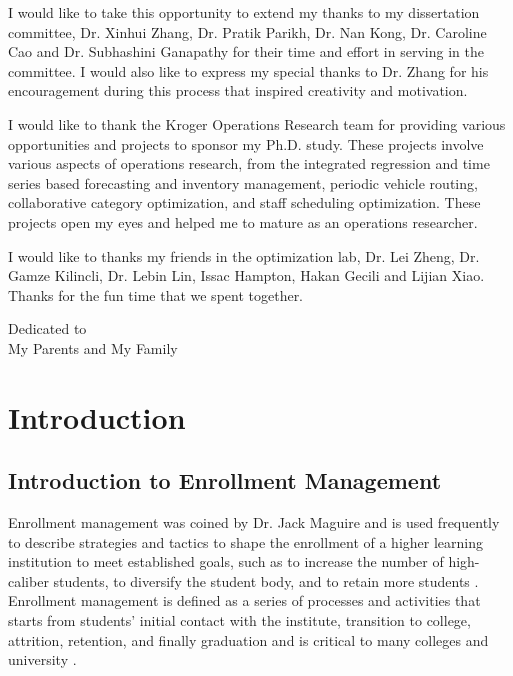 \documentclass[12pt,english]{report}
\begin{document}
\setlength{\parindent}{2em}

I would like to take this opportunity to extend my thanks to my dissertation
committee,  Dr. Xinhui Zhang, Dr. Pratik Parikh, Dr. Nan Kong, Dr. Caroline Cao
and Dr. Subhashini Ganapathy for their time and effort in serving in the
committee.  I would also like to express my special thanks to Dr. Zhang for his
encouragement during this process that inspired creativity and motivation.

I would like to thank the Kroger Operations Research team for providing various
opportunities and projects to sponsor my Ph.D. study.  These projects involve
various aspects of operations research, from the integrated regression and time
series based forecasting and inventory management, periodic vehicle routing,
collaborative category optimization, and staff scheduling optimization.  These
projects open my eyes and helped me to mature as an operations researcher.

I would like to thanks my friends in the optimization lab,  Dr. Lei Zheng, Dr.
Gamze Kilincli, Dr. Lebin Lin, Issac Hampton, Hakan Gecili and Lijian Xiao.
Thanks for the fun time that we spent together.

%
\newpage
\thispagestyle{plain}
\vspace*{3in}
\begin{center}
	Dedicated to\\
	My Parents and My Family
\end{center}
%
%
%

\newpage
\setcounter{page}{1}
\setlength{\parindent}{2em}
\chapter{Introduction}

\section{Introduction to Enrollment Management}

Enrollment management was coined by Dr. Jack Maguire \citep{Maguire1976} and is
used frequently to describe strategies and tactics to shape the enrollment of a
higher learning institution to meet established goals, such as to increase the
number of high-caliber students, to diversify the student body, and to retain
more students \citep{Kemerer1982}.   Enrollment management is defined as a
series of processes and activities that starts from students' initial contact
with the institute, transition to college, attrition, retention, and finally
graduation \citep{Hossler1990} and is critical to many colleges and university
\citep{Braunstein1999, Maltz2007, Aksenova2006}.
\end{document}
